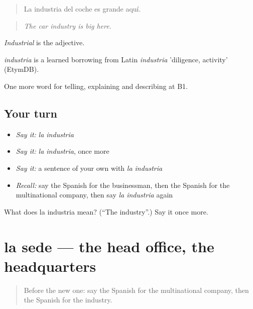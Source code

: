 \begin{quote}
La industria del coche es grande aquí.
\end{quote}

\begin{quote}
\emph{The car industry is big here.}
\end{quote}

\emph{Industrial} is the adjective.

\begin{cousinweb}
\emph{industria} is a learned borrowing from Latin \emph{industria} 'diligence, activity' (EtymDB).
\end{cousinweb}

\begin{grammarlens}[title={What you've built}]
One more word for telling, explaining and describing at B1.
\end{grammarlens}

\subsection*{Your turn}
\begin{itemize}
\raggedright
  \item \emph{Say it:} \emph{la industria}
  \item \emph{Say it:} \emph{la industria}, once more
  \item \emph{Say it:} a sentence of your own with \emph{la industria}
  \item \emph{Recall:} say the Spanish for the businessman, then the Spanish for the multinational company, then say \emph{la industria} again
\end{itemize}

\begin{tcolorbox}[breakable,colback=teal!4,colframe=teal!35!black,title={Before you move on}]
What does la industria mean? (\textquotedblleft{}The industry\textquotedblright{}.) Say it once more.
\end{tcolorbox}
\section[la sede]{la sede — the head office, the headquarters}

\label{lesson:ES-C592-sede}



\begin{quote}
Before the new one: say the Spanish for the multinational company, then the Spanish for the industry.
\end{quote}

